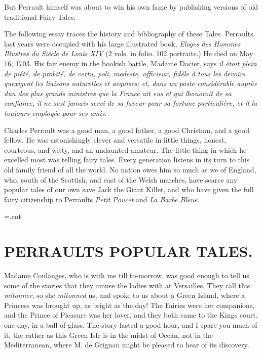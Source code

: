 \documentclass[14pt,a4paper]{memoir}
\makeatletter
\newcommand{\resetpagenotes}{%
  \immediate\closeout\@notefile
  \immediate\openout\@notefile=\jobname.ent
  \setcounter{pagenote}{0}
}
\makeatother
\begin{document}
But Perrault himself was about to win his own fame by publishing
versions of old traditional Fairy Tales.

The following essay traces the history and bibliography of these Tales.
Perrault\textquotesingle s last years were occupied with his large
illustrated book, \emph{Eloges des Hommes Illustres du Siècle de Louis
XIV} (2 vols. in folio. 102 portraits.) He died on May 16, 1703. His
fair enemy in the bookish battle, Madame Dacier, says
\textquotesingle{}\emph{il étoit plein de piété, de probité, de vertu,
poli, modeste, officieux, fidèle à tous les devoirs
qu\textquotesingle exigent les liaisons naturelles et acquises; et, dans
un poste considérable auprès d\textquotesingle un des plus grands
ministres que la France ait eus et qui l\textquotesingle honoroit de sa
confiance, il ne s\textquotesingle est jamais servi de sa faveur pour sa
fortune particulière, et il l\textquotesingle a toujours employée pour
ses amis}.\textquotesingle{}

Charles Perrault was a good man, a good father, a good Christian, and a
good fellow. He was astonishingly clever and versatile in little things,
honest, courteous, and witty, and an undaunted amateur. The little thing
in which he excelled most was telling fairy tales. Every generation
listens in its turn to this old family friend of all the world. No
nation owes him so much as we of England, who, south of the Scottish,
and east of the Welsh marches, have scarce any popular tales of our own
save Jack the Giant Killer, and who have given the full fairy
citizenship to Perrault\textquotesingle s \emph{Petit Poucet} and
\emph{La Barbe Bleue}.

\clearpage
\printpagenotes
\resetpagenotes

\mainmatter

\part{PERRAULT\textquotesingle S POPULAR TALES.}

\textquotesingle Madame Coulanges, who is with me till to-morrow, was
good enough to tell us some of the stories that they amuse the ladies
with at Versailles. They call this \emph{mitonner}, so she
\emph{mitonned} us, and spoke to us about a Green Island, where a
Princess was brought up, as bright as the day! The Fairies were her
companions, and the Prince of Pleasure was her lover, and they both came
to the King\textquotesingle s court, one day, in a ball of glass. The
story lasted a good hour, and I spare you much of it, the rather as this
Green Isle is in the midst of Ocean, not in the Mediterranean, where M.
de Grignan might be pleased to hear of its discovery.\textquotesingle{}
\end{document}
